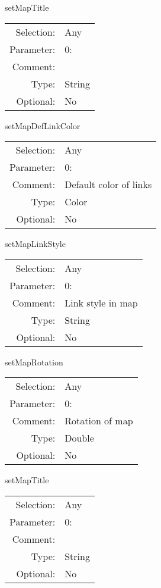 \item setMapTitle\\
\begin{tabular}{rl}
  Selection: & Any\\
   Parameter: &  0:\\
        Comment: & \\
           Type: & String\\
       Optional: &  No\\
\end{tabular}

\item setMapDefLinkColor\\
\begin{tabular}{rl}
  Selection: & Any\\
   Parameter: &  0:\\
        Comment: & Default color of links\\
           Type: & Color\\
       Optional: &  No\\
\end{tabular}

\item setMapLinkStyle\\
\begin{tabular}{rl}
  Selection: & Any\\
   Parameter: &  0:\\
        Comment: & Link style in map\\
           Type: & String\\
       Optional: &  No\\
\end{tabular}

\item setMapRotation\\
\begin{tabular}{rl}
  Selection: & Any\\
   Parameter: &  0:\\
        Comment: & Rotation of map\\
           Type: & Double\\
       Optional: &  No\\
\end{tabular}

\item setMapTitle\\
\begin{tabular}{rl}
  Selection: & Any\\
   Parameter: &  0:\\
        Comment: & \\
           Type: & String\\
       Optional: &  No\\
\end{tabular}

